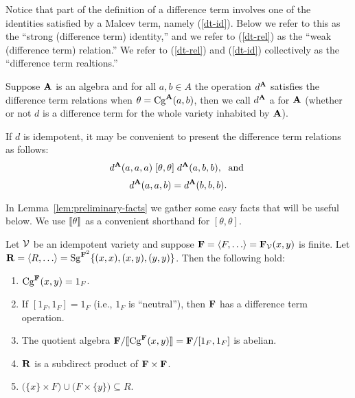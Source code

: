 Notice that part of
the definition of a difference term involves one of
the identities satisfied by a Malcev term, namely
(\ref{dt-id}). Below we refer to this as the ``strong (difference term) identity,''
and we refer to (\ref{dt-rel}) as the ``weak (difference term) relation.''
We refer to (\ref{dt-rel}) and (\ref{dt-id}) collectively as the ``difference term
realtions.''

Suppose $\mathbf{A}$ is an algebra and for all $a,b \in A$
the operation $d^{\mathbf{A}}$ satisfies the difference term relations when
$\theta = \operatorname{Cg}^{\mathbf{A}}(a,b)$, then we call $d^{\mathbf{A}}$
a  for $\mathbf{A}$
(whether or not $d$ is a difference
term for the whole variety inhabited by $\mathbf{A}$).

If $d$ is idempotent, it may be convenient to present the difference term
relations as follows:
\begin{equation}
  \label{dt-rel-idemp}
  d^{\mathbf{A}}(a,a,a) \mathrel{[\theta, \theta]} d^{\mathbf{A}}(a,b,b), \; \text{ and }
\end{equation}
\begin{equation}
  \label{dt-id-idemp}
d^{\mathbf{A}}(a,a,b) =   d^{\mathbf{A}}(b,b,b).
\end{equation}

In Lemma~\ref{lem:preliminary-facts} we gather
some easy facts that will be useful below.
We use $\llbracket \theta \rrbracket$ as a convenient shorthand for 
$[\theta,\theta]$. %
\begin{lemma}
\label{lem:preliminary-facts}
Let $\mathcal{V}$ be an idempotent variety and suppose 
$\bF = \<F, \dots\> = \bF_{\sV}(x,y)$ is finite. 
Let $\bR = \<R, \dots\> = \Sg^{\bF^2}\{(x, x), (x, y), (y, y)\}$. 
Then the following hold:
\begin{enumerate}
\item \label{item:1}
  $\operatorname{Cg}^{\mathbf{F}}(x,y) = 1_F$.

  \smallskip
\item \label{item:1.5}
  If $[1_F, 1_F] = 1_F$ (i.e., $1_F$ is ``neutral''), then
  $\mathbf{F}$ has a difference term operation.

\smallskip
\item \label{item:2}
The quotient algebra $\mathbf{F}/\llbracket \operatorname{Cg}^{\mathbf{F}}(x,y) \rrbracket = \mathbf{F}/[1_F,1_F]$ is abelian.


\smallskip
\item \label{item:3}
  $\mathbf{R}$ is a subdirect product of %
  $\mathbf{F}\times \mathbf{F}$.

\smallskip
\item \label{item:4}
$\bigl(\{x\} \times F\bigr) \cup \bigl(F \times \{y\}\bigr) \subseteq R$.

\end{enumerate}
\end{lemma}



